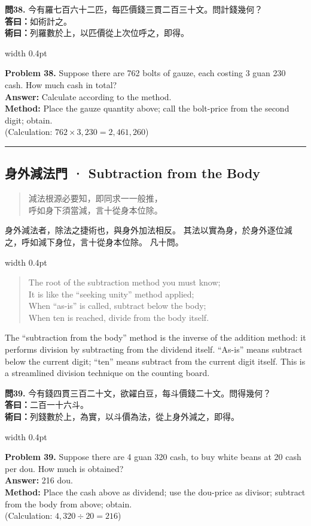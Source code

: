 \documentclass[10pt,a4paper]{article}
\newcommand{\longline}{\noindent\rule{\textwidth}{0.3pt}}
\newlength{\cnwidth}
\newlength{\enwidth}
\newcommand{\bilingual}[2]{%
  \noindent%
  \begin{minipage}[t]{\cnwidth}%
    #1%
  \end{minipage}%
  \hfill\vrule width 0.4pt\hfill%
  \begin{minipage}[t]{\enwidth}%
    #2%
  \end{minipage}%
  \par\smallskip%
}
\newcommand{\bilingualsubsection}[2]{%
  \subsection*{#1 · #2}
}
\newenvironment{rhymecn}{%
  \begin{quote}\itshape\color{verselinecolor}
}{\end{quote}}
\begin{document}
\bilingual{%
  \textbf{問38.}
  今有羅七百六十二匹，每匹價錢三貫二百三十文。問計錢幾何？\\
  \textbf{答曰：}如術計之。\\
  \textbf{術曰：}列羅數於上，以匹價從上次位呼之，即得。
}{%
  \textbf{Problem 38.}
  Suppose there are 762 bolts of gauze, each costing 3 guan 230 cash.
  How much cash in total?\\
  \textbf{Answer:} Calculate according to the method.\\
  \textbf{Method:} Place the gauze quantity above; call the bolt-price from
  the second digit; obtain.\\
  (Calculation: $762 \times 3{,}230 = 2{,}461{,}260$)
}

\longline


\bilingualsubsection{身外減法門}{Subtraction from the Body}
\label{sec:shenwaijian}

\bilingual{%
  \begin{rhymecn}
  減法根源必要知，即同求一一般推，\\
  呼如身下須當減，言十從身本位除。
  \end{rhymecn}
  身外減法者，除法之捷術也，與身外加法相反。
  其法以實為身，於身外逐位減之，呼如減下身位，言十從身本位除。
  凡十問。
}{%
  \begin{rhymecn}
  The root of the subtraction method you must know;\\
  It is like the ``seeking unity'' method applied;\\
  When ``as-is'' is called, subtract below the body;\\
  When ten is reached, divide from the body itself.
  \end{rhymecn}
  The ``subtraction from the body'' method is the inverse of the addition
  method: it performs division by subtracting from the dividend itself.
  ``As-is'' means subtract below the current digit; ``ten'' means subtract from
  the current digit itself. This is a streamlined division technique on the
  counting board.
}

\bilingual{%
  \textbf{問39.}
  今有錢四貫三百二十文，欲糴白豆，每斗價錢二十文。問得幾何？\\
  \textbf{答曰：}二百一十六斗。\\
  \textbf{術曰：}列錢數於上，為實，以斗價為法，從上身外減之，即得。
}{%
  \textbf{Problem 39.}
  Suppose there are 4 guan 320 cash, to buy white beans at 20 cash per dou.
  How much is obtained?\\
  \textbf{Answer:} 216 dou.\\
  \textbf{Method:} Place the cash above as dividend; use the dou-price as divisor;
  subtract from the body from above; obtain.\\
  (Calculation: $4{,}320 \div 20 = 216$)
}
\end{document}
